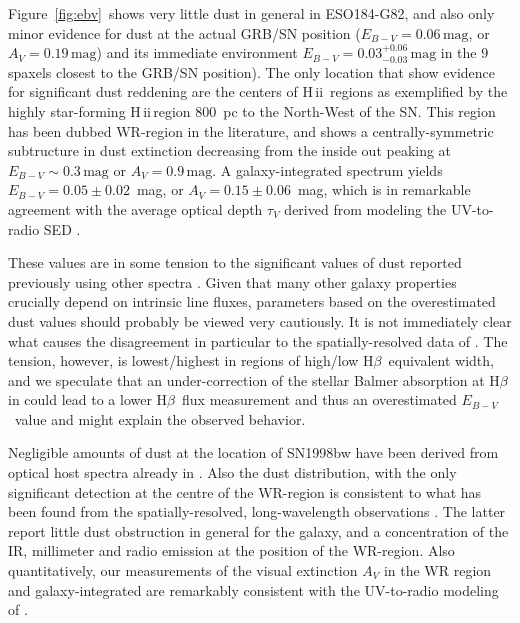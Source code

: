 \documentclass[traditabstract]{aa}
\newcommand{\hb}{H$\beta$}
\newcommand{\hii}{\mbox{H\,{\sc ii}}}
\newcommand{\ebv}{$E_{B-V}\,$}
\begin{document}
Figure~\ref{fig:ebv}~shows very little dust in general in ESO184-G82, and also only minor evidence for dust at the actual GRB/SN position ($E_{B-V} = 0.06\,\mathrm{mag}$, or $A_V = 0.19\,\mathrm{mag}$) and its immediate environment $E_{B-V} = 0.03_{-0.03}^{+0.06}\,\mathrm{mag}$ in the 9 spaxels closest to the GRB/SN position). The only location that show evidence for significant dust reddening are the centers of \hii\, regions as exemplified by the highly star-forming \hii\,region 800~pc to the North-West of the SN. This region has been dubbed WR-region in the literature, and shows a centrally-symmetric subtructure in dust extinction decreasing from the inside out peaking at $E_{B-V} \sim 0.3\,\mathrm{mag}$ or $A_V = 0.9\,\mathrm{mag}$. A galaxy-integrated spectrum yields $E_{B-V} = 0.05\pm0.02$~mag, or $A_V=0.15\pm0.06$~mag, which is in remarkable agreement with the average optical depth $\tau_V$ derived from modeling the UV-to-radio SED \citep{2014A&A...562A..70M}.

These values are in some tension to the significant values of dust reported previously using other spectra \citep{2006A&A...454..103H, 2008A&A...490...45C, 2009ApJ...691..182S}. Given that many other galaxy properties crucially depend on intrinsic line fluxes, parameters based on the overestimated dust values should probably be viewed very cautiously. It is not immediately clear what causes the disagreement in particular to the spatially-resolved data of \citet{2008A&A...490...45C}. The tension, however, is lowest/highest in regions of high/low \hb\, equivalent width, and we speculate that an under-correction of the stellar Balmer absorption at \hb\, in \citet{2008A&A...490...45C} could lead to a lower \hb\, flux measurement and thus an overestimated \ebv~value and might explain the observed behavior.

Negligible amounts of dust at the location of SN1998bw have been derived from optical host spectra already in \citet{2005NewA...11..103S}. Also the dust distribution, with the only significant detection at the centre of the WR-region is consistent to what has been found from the spatially-resolved, long-wavelength observations \citep{2014A&A...562A..70M}. The latter report little dust obstruction in general for the galaxy, and a concentration of the IR, millimeter and radio emission at the position of the WR-region. Also quantitatively, our measurements of the visual extinction $A_V$ in the WR region and galaxy-integrated are remarkably consistent with the UV-to-radio modeling of \citet{2014A&A...562A..70M}.
\end{document}
